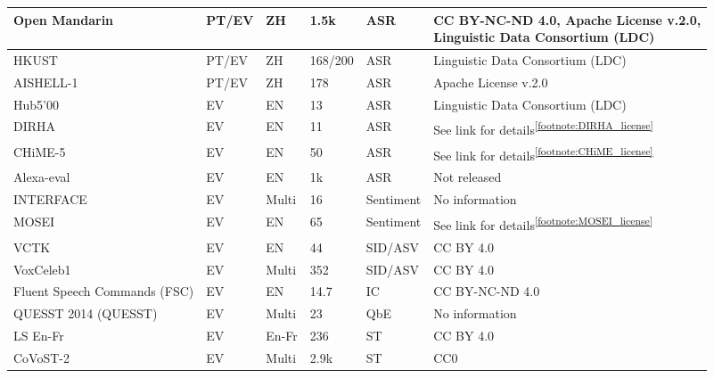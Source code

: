 \begin{table*}[ht]
{\begin{tabular}{llllll}
    Open Mandarin & PT/EV & ZH & 1.5k & ASR & \makecell[l]{CC BY-NC-ND 4.0, Apache License v.2.0,\\ Linguistic Data Consortium (LDC)} \\ \hline %
    HKUST & PT/EV & ZH & 168/200 & ASR & Linguistic Data Consortium (LDC) \\ \hline %
    AISHELL-1 & PT/EV & ZH & 178 & ASR & Apache License v.2.0 \\ \hline %
    Hub5'00 & EV & EN & 13 & ASR & Linguistic Data Consortium (LDC) \\ \hline %
    DIRHA & EV & EN & 11 & ASR & See link for details\textsuperscript{\ref{footnote:DIRHA_license}} \\ \hline %
    CHiME-5 & EV & EN & 50 & ASR & See link for details\textsuperscript{\ref{footnote:CHiME_license}}\\ \hline %
    Alexa-eval & EV & EN & 1k & ASR & Not released \\ \hline %
    INTERFACE & EV & Multi & 16 & Sentiment & No information \\ \hline %
    MOSEI & EV & EN & 65 & Sentiment & See link for details\textsuperscript{\ref{footnote:MOSEI_license}}\\ \hline %
    VCTK & EV & EN & 44 & SID/ASV & CC BY 4.0 \\ \hline %
    VoxCeleb1 & EV & Multi & 352 & SID/ASV & CC BY 4.0 \\ \hline
    Fluent Speech Commands (FSC) & EV & EN & 14.7 & IC & CC BY-NC-ND 4.0 \\ \hline
    QUESST 2014 (QUESST) & EV & Multi & 23 & QbE & No information \\ \hline
    LS En-Fr & EV & En-Fr & 236 & ST & CC BY 4.0 \\ \hline %
    CoVoST-2 & EV & Multi & 2.9k & ST & CC0 \\ \hline


\end{tabular}}
\end{table*}
